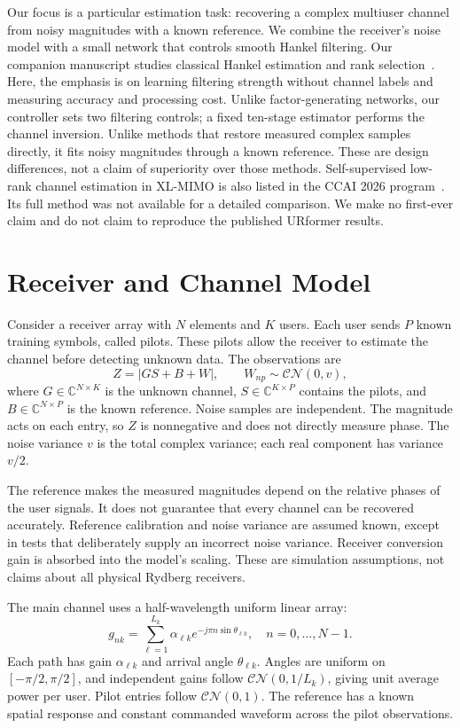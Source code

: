 \documentclass[journal]{IEEEtran}
\newcommand{\CN}{\mathcal{CN}}
\begin{document}
Our focus is a particular estimation task: recovering a complex multiuser
channel from noisy magnitudes with a known reference. We combine the
receiver's noise model with a small network that controls smooth Hankel
filtering. Our companion manuscript studies classical Hankel estimation and
rank selection~\cite{haatimcompanion}. Here, the emphasis is on learning
filtering strength without channel labels and measuring accuracy and
processing cost. Unlike factor-generating networks, our controller
sets two filtering controls; a fixed ten-stage estimator performs
the channel inversion. Unlike methods that restore measured complex
samples directly, it fits noisy magnitudes through a known reference.
These are design differences, not a claim of superiority over those
methods. Self-supervised low-rank channel estimation in XL-MIMO is also
listed in the CCAI 2026 program~\cite{ccai2026}. Its full method was not
available for a detailed comparison. We make no first-ever claim and
do not claim to reproduce the published URformer results.

\section{Receiver and Channel Model}
Consider a receiver array with $N$ elements and $K$ users. Each user sends
$P$ known training symbols, called pilots. These pilots allow the receiver
to estimate the channel before detecting unknown data. The observations are
\begin{equation}
 Z=|GS+B+W|,\qquad W_{np}\sim\CN(0,v),
 \label{eq:model}
\end{equation}
where $G\in\mathbb C^{N\times K}$ is the unknown channel,
$S\in\mathbb C^{K\times P}$ contains the pilots, and
$B\in\mathbb C^{N\times P}$ is the known reference. Noise samples are
independent. The magnitude acts on each entry, so $Z$ is nonnegative and
does not directly measure phase. The noise variance $v$ is the total
complex variance; each real component has variance $v/2$.

The reference makes the measured magnitudes depend on the relative phases
of the user signals. It does not guarantee that every channel can be
recovered accurately. Reference calibration and noise variance are assumed
known, except in tests that deliberately supply an incorrect noise variance.
Receiver conversion gain is absorbed into the model's scaling. These are
simulation assumptions, not claims about all physical Rydberg receivers.

The main channel uses a half-wavelength uniform linear array:
\begin{equation}
 g_{nk}=\sum_{\ell=1}^{L_k}\alpha_{\ell k}
 e^{-j\pi n\sin\theta_{\ell k}},\quad n=0,\ldots,N-1.
 \label{eq:channel}
\end{equation}
Each path has gain $\alpha_{\ell k}$ and arrival angle $\theta_{\ell k}$.
Angles are uniform on $[-\pi/2,\pi/2]$, and independent gains follow
$\CN(0,1/L_k)$, giving unit average power per user. Pilot entries follow
$\CN(0,1)$. The reference has a known spatial response and constant
commanded waveform across the pilot observations.
\end{document}
